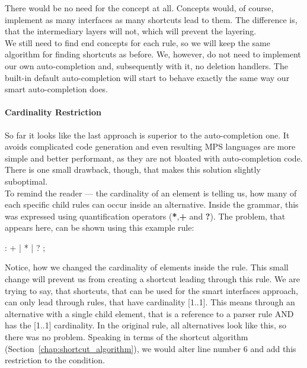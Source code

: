 There would be no need for the  concept at all.
Concepts would, of course, implement as many interfaces as many shortcuts lead to them.
The difference is, that the intermediary layers will not, which will prevent the layering.
\\

We still need to find end concepts for each rule, so we will keep the same algorithm for finding shortcuts as before.
We, however, do not need to implement our own auto-completion and, subsequently with it, no deletion handlers.
The built-in default auto-completion will start to behave exactly the same way our smart auto-completion does.

\paragraph{Cardinality Restriction}
\label{chap:cardinality_restriction}

So far it looks like the last approach is superior to the auto-completion one.
It avoids complicated code generation and even resulting MPS languages are more simple and better performant, as they are not bloated with auto-completion code.
There is one small drawback, though, that makes this solution slightly suboptimal.
\\

To remind the reader --- the cardinality of an element is telling us, how many of each specific child rules can occur inside an alternative.
Inside the grammar, this was expressed using quantification operators (\textbf{*},\textbf{+} and \textbf{?}).
The problem, that appears here, can be shown using this example rule:

\begin{antlr}
      :   +
             |   *
             |   ?
             ;
\end{antlr}

Notice, how we changed the cardinality of elements inside the  rule.
This small change will prevent us from creating a shortcut leading through this rule.
We are trying to say, that shortcuts, that can be used for the smart interfaces approach, can only lead through rules, that have cardinality [1..1].
This means through an alternative with a single child element, that is a reference to a parser rule AND has the [1..1] cardinality.
In the original  rule, all alternatives look like this, so there was no problem.
Speaking in terms of the shortcut algorithm (Section~\ref{chap:shortcut_algorithm}), we would alter line number 6 and add this restriction to the condition.
\\

